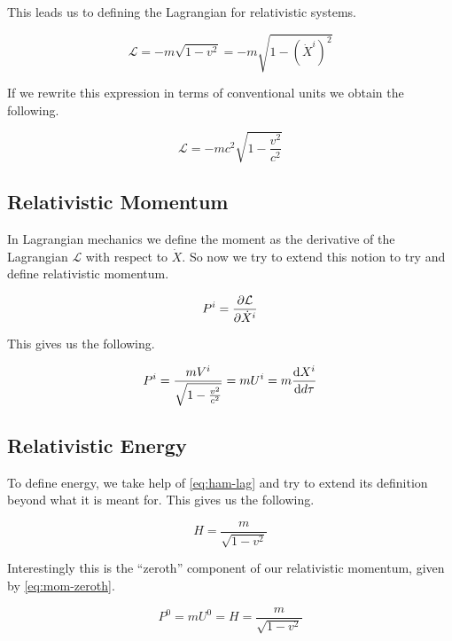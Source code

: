 \documentclass[12pt]{article}
\numberwithin{equation}{section}
\theoremstyle{plain}
\theoremstyle{definition}
\begin{document}
This leads us to defining the Lagrangian for relativistic systems.

\begin{equation}
    \mathcal{L} = -m \sqrt{1 - v^2} = -m \sqrt{1 - (\dot X^i)^2} 
    \label{eq:rel-lagrangian}
\end{equation}

If we rewrite this expression in terms of conventional units we obtain the following.

\begin{equation}
    \mathcal{L} = -mc^2 \sqrt{1 - \frac{v^2}{c^2}}
    \label{eq:rel-lag-conventional}
\end{equation}

\subsection{Relativistic Momentum}

In Lagrangian mechanics we define the moment as the derivative of the Lagrangian $\mathcal{L}$ with respect to $\dot X$. So now we try to extend this notion to try and define relativistic momentum.

\begin{equation}
    P^i = \pdv{\mathcal{L}}{\dot X^i}
    \label{eq:rel-momentum}
\end{equation}

This gives us the following.

\begin{equation}
    P^i = \frac{mV^i}{\sqrt{1- \frac{v^2}{c^2}}} = mU^i = m \dv{X^i}{d\tau}
    \label{eq:rel-momentum-2}
\end{equation}

\subsection{Relativistic Energy}

To define energy, we take help of \eqref{eq:ham-lag} and try to extend its definition beyond what it is meant for. This gives us the following.

\begin{equation}
    H = \frac{m}{\sqrt{1-v^2}}
    \label{eq:rel-energy}
\end{equation}

Interestingly this is the ``zeroth'' component of our relativistic momentum, given by \eqref{eq:mom-zeroth}.

\begin{equation}
    P^0 = mU^0 = H = \frac{m}{\sqrt{1-v^2}} 
    \label{eq:mom-zeroth}
\end{equation}
 
\end{document}
